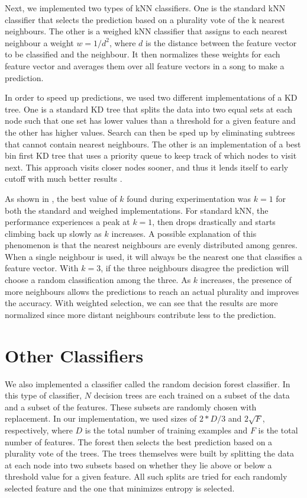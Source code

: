 \documentclass[journal,hidelinks]{IEEEtran}
\begin{document}
Next, we implemented two types of kNN classifiers. One is the standard kNN classifier that selects the prediction based on a plurality vote of the k nearest neighbours. The other is a weighed kNN classifier that assigns to each nearest neighbour a weight $w = 1 / d^2$, where $d$ is the distance between the feature vector to be classified and the neighbour. It then normalizes these weights for each feature vector and averages them over all feature vectors in a song to make a prediction.

In order to speed up predictions, we used two different implementations of a KD tree. One is a standard KD tree that splits the data into two equal sets at each node such that one set has lower values than a threshold for a given feature and the other has higher values. Search can then be sped up by eliminating subtrees that cannot contain nearest neighbours. The other is an implementation of a best bin first KD tree that uses a priority queue to keep track of which nodes to visit next. This approach visits closer nodes sooner, and thus it lends itself to early cutoff with much better results \cite{beis_shape_1997}.

As shown in , the best value of $k$ found during experimentation was $k = 1$ for both the standard and weighed implementations. For standard kNN, the performance experiences a peak at $k = 1$, then drops drastically and starts climbing back up slowly as $k$ increases. A possible explanation of this phenomenon is that the nearest neighbours are evenly distributed among genres. When a single neighbour is used, it will always be the nearest one that classifies a feature vector. With $k = 3$, if the three neighbours disagree the prediction will choose a random classification among the three. As $k$ increases, the presence of more neighbours allows the predictions to reach an actual plurality and improves the accuracy. With weighted selection, we can see that the results are more normalized since more distant neighbours contribute less to the prediction.

\section{Other Classifiers}

We also implemented a classifier called the random decision forest classifier. In this type of classifier, $N$ decision trees are each trained on a subset of the data and a subset of the features. These subsets are randomly chosen with replacement. In our implementation, we used sizes of $2 * D / 3$ and $2 \sqrt{F}$, respectively, where $D$ is the total number of training examples and $F$ is the total number of features. The forest then selects the best prediction based on a plurality vote of the trees. The trees themselves were built by splitting the data at each node into two subsets based on whether they lie above or below a threshold value for a given feature. All such splits are tried for each randomly selected feature and the one that minimizes entropy is selected.
\end{document}
